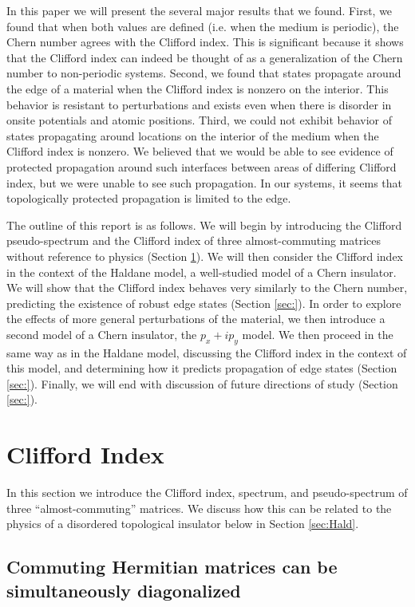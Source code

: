 \documentclass[a4paper]{article}
\begin{document}
In this paper we will present the several major results that we found. First, we found that when both values are defined (i.e. when the medium is periodic), the Chern number agrees with the Clifford index. This is significant because it shows that the Clifford index can indeed be thought of as a generalization of the Chern number to non-periodic systems. Second, we found that states propagate around the edge of a material when the Clifford index is nonzero on the interior. This behavior is resistant to perturbations and exists even when there is disorder in onsite potentials and atomic positions. Third, we could not exhibit behavior of states propagating around locations on the interior of the medium when the Clifford index is nonzero. We believed that we would be able to see evidence of protected propagation around such interfaces between areas of differing Clifford index, but we were unable to see such propagation. In our systems, it seems that topologically protected propagation is limited to the edge.

The outline of this report is as follows. We will begin by introducing the Clifford pseudo-spectrum and the Clifford index of three almost-commuting matrices without reference to physics (Section \ref{sec:Cliff_ind}). We will then consider the Clifford index in the context of the Haldane model, a well-studied model of a Chern insulator. We will show that the Clifford index behaves very similarly to the Chern number, predicting the existence of robust edge states (Section \ref{sec:}). In order to explore the effects of more general perturbations of the material, we then introduce a second model of a Chern insulator, the $p_x + ip_y$ model. We then proceed in the same way as in the Haldane model, discussing the Clifford index in the context of this model, and determining how it predicts propagation of edge states (Section \ref{sec:}). Finally, we will end with discussion of future directions of study (Section \ref{sec:}).

\section{Clifford Index} \label{sec:Cliff_ind}	 

In this section we introduce the Clifford index, spectrum, and pseudo-spectrum of three ``almost-commuting'' matrices. We discuss how this can be related to the physics of a disordered topological insulator below in Section \ref{sec:Hald}.

\subsection{Commuting Hermitian matrices can be simultaneously diagonalized} \label{sec:Cliff_ind_comm}
\end{document}
